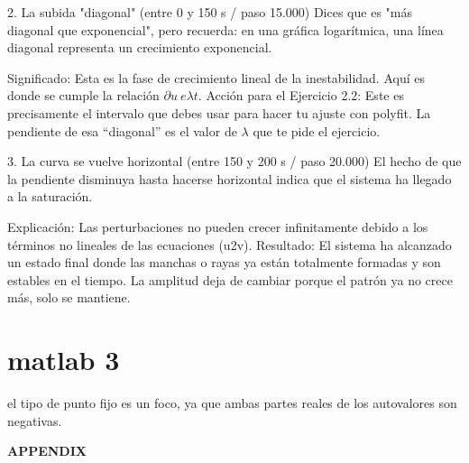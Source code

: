 \documentclass[]{article}
\begin{document}
2. La subida "diagonal" (entre 0 y 150 s / paso 15.000)
Dices que es "más diagonal que exponencial", pero recuerda: en una gráfica logarítmica, una línea diagonal representa un crecimiento exponencial.

    Significado: Esta es la fase de crecimiento lineal de la inestabilidad. Aquí es donde se cumple la relación $\partial u~e\lambda t$.
    Acción para el Ejercicio 2.2: Este es precisamente el intervalo que debes usar para hacer tu ajuste con polyfit. La pendiente de esa ``diagonal'' es el valor de $\lambda$ que te pide el ejercicio.

3. La curva se vuelve horizontal (entre 150 y 200 s / paso 20.000)
El hecho de que la pendiente disminuya hasta hacerse horizontal indica que el sistema ha llegado a la saturación.

    Explicación: Las perturbaciones no pueden crecer infinitamente debido a los términos no lineales de las ecuaciones (u2v).
    Resultado: El sistema ha alcanzado un estado final donde las manchas o rayas ya están totalmente formadas y son estables en el tiempo. La amplitud deja de cambiar porque el patrón ya no crece más, solo se mantiene.


\section{matlab 3}

el tipo de punto fijo es un foco, ya que ambas partes reales de los autovalores son negativas.




\appendix
\textbf{APPENDIX}
\end{document}
